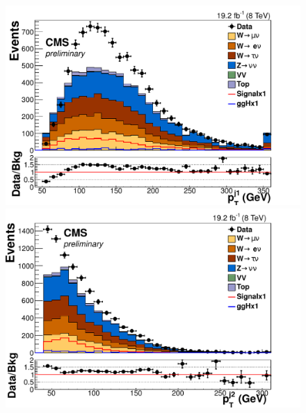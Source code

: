 \begin{figure}
  \includegraphics[width=.65\largefigwidth]{plots/parked/AN-14-243-figs/output_presel/nunu_jet1_pt.pdf}
  \includegraphics[width=.65\largefigwidth]{plots/parked/AN-14-243-figs/output_presel/nunu_jet2_pt.pdf}


\end{figure}
